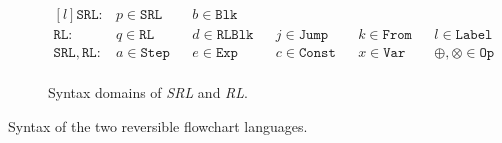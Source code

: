 \begin{figure}[b!]
  \begin{subfigure}{\textwidth}
    \center
    $$\begin{matrix*}[l]
      \mathtt{SRL}:     & {p}\in\mathtt{SRL}  & & {b}\in\mathtt{Blk}\\
      \mathtt{RL}:      & {q}\in\mathtt{RL}   & & {d}\in\mathtt{RLBlk} & & {j}\in\mathtt{Jump}  & & {k}\in\mathtt{From} & & {l}\in\mathtt{Label}\\
      \mathtt{SRL, RL}: & {a}\in\mathtt{Step} & &  e\in\mathtt{Exp}   & & {c}\in\mathtt{Const} & & {x}\in\mathtt{Var}  & & \oplus,\otimes\in\mathtt{Op}\\
    \end{matrix*}$$
    \caption{Syntax domains of \textit{SRL} and \textit{RL}.}\label{fig:common}
  \end{subfigure}

  \caption{Syntax of the two reversible flowchart languages.}
  \label{fig:rl_srl_syntax_and_structure}

\end{figure}
